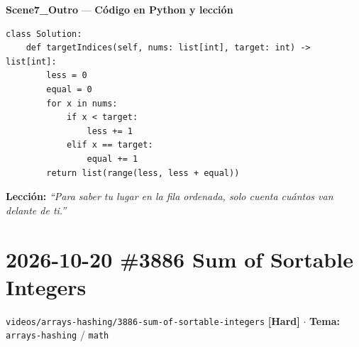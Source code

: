 \documentclass[letterpaper,10pt]{article}
\newcommand{\scene}[2]{\noindent\textbf{\textcolor{mcaqua}{#1}} --- \textbf{#2}\par\vspace{1pt}}
\newcommand{\folder}[1]{\texttt{\textcolor{mcgreen}{#1}}}
\newcommand{\badge}[2]{\textbf{\textcolor{#1}{[#2]}}}
\begin{document}
\scene{Scene7\_Outro}{C\'odigo en Python y lecci\'on}
\begin{Verbatim}[frame=single,fontsize=\small]
class Solution:
    def targetIndices(self, nums: list[int], target: int) -> list[int]:
        less = 0
        equal = 0
        for x in nums:
            if x < target:
                less += 1
            elif x == target:
                equal += 1
        return list(range(less, less + equal))
\end{Verbatim}
\textbf{Lecci\'on:} \textit{``Para saber tu lugar en la fila ordenada, solo cuenta cu\'antos van delante de ti.''}

\newpage

\section{2026-10-20 \textbar{} \#3886 Sum of Sortable Integers}
\folder{videos/arrays-hashing/3886-sum-of-sortable-integers} \hfill \badge{mcred}{Hard} $\cdot$ \textbf{Tema:} \texttt{arrays-hashing} / \texttt{math}
\end{document}
